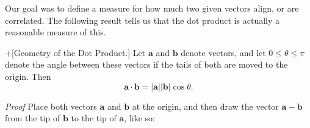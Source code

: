\documentclass[10pt,]{book}
\makeatletter
\theoremstyle{ptxplainnotitle}
\theoremstyle{ptxplaintitle}
\theoremstyle{ptxplainnotitle}
\theoremstyle{ptxplaintitle}
\theoremstyle{ptxplainnotitle}
\theoremstyle{ptxplaintitle}
\renewcommand*{\proofname}{Proof}
\renewenvironment{proof}[1][\proofname]{\par
  \pushQED{\qed}%
  \normalfont \topsep6\p@\@plus6\p@\relax
  \trivlist
  \item\relax
    {\itshape
    #1\@addpunct{.}}\hspace\labelsep\ignorespaces
}{%
  \popQED\endtrivlist\@endpefalse
}
\theoremstyle{ptxdefinitionnotitle}
\theoremstyle{ptxdefinitiontitle}
\theoremstyle{ptxdefinitionnotitle}
\theoremstyle{ptxdefinitiontitle}
\theoremstyle{ptxdefinitionnotitle}
\theoremstyle{ptxdefinitiontitle}
\theoremstyle{ptxdefinitionnotitle}
\theoremstyle{ptxdefinitiontitle}
\theoremstyle{ptxdefinitionnotitle}
\theoremstyle{ptxdefinitiontitle}
\numberwithin{equation}{section}
\newcommand{\vv}[1]{\mathbf{#1}}
\makeatother
\begin{document}
\hypertarget{p-796}{}%
Our goal was to define a measure for how much two given vectors align, or are correlated. The following result tells us that the dot product is actually a reasonable measure of this.%
\begin{theorem}+[{Geometry of the Dot Product.}]\label{theorem-geometry-of-the-dot-product}
\hypertarget{p-797}{}%
Let \(\vv{a}\) and \(\vv{b}\) denote vectors, and let \(0\leq\theta\leq\pi\) denote the angle between these vectors if the tails of both are moved to the origin. Then%
%
\begin{equation*}
\vv{a}\cdot\vv{b} = |\vv{a}||\vv{b}|\cos\theta.
\end{equation*}
\end{theorem}
\begin{proof}\hypertarget{proof-13}{}
\hypertarget{p-798}{}%
Place both vectors \(\vv{a}\) and \(\vv{b}\) at the origin, and then draw the vector \(\vv{a}-\vv{b}\) from the tip of \(\vv{b}\) to the tip of \(\vv{a}\), like so:%
\begin{figure}
\centering
{
}
\end{figure}
\end{proof}
\end{document}
